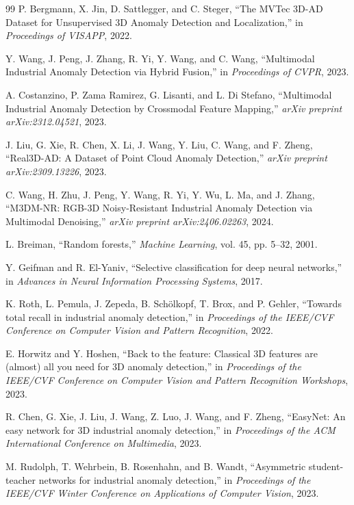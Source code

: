 \documentclass[11pt]{article}
\begin{document}
\begin{thebibliography}{99}
P. Bergmann, X. Jin, D. Sattlegger, and C. Steger, ``The MVTec 3D-AD Dataset
for Unsupervised 3D Anomaly Detection and Localization,'' in
\emph{Proceedings of VISAPP}, 2022.

Y. Wang, J. Peng, J. Zhang, R. Yi, Y. Wang, and C. Wang, ``Multimodal
Industrial Anomaly Detection via Hybrid Fusion,'' in \emph{Proceedings of
CVPR}, 2023.

A. Costanzino, P. Zama Ramirez, G. Lisanti, and L. Di Stefano, ``Multimodal
Industrial Anomaly Detection by Crossmodal Feature Mapping,'' \emph{arXiv
preprint arXiv:2312.04521}, 2023.

J. Liu, G. Xie, R. Chen, X. Li, J. Wang, Y. Liu, C. Wang, and F. Zheng,
``Real3D-AD: A Dataset of Point Cloud Anomaly Detection,'' \emph{arXiv
preprint arXiv:2309.13226}, 2023.

C. Wang, H. Zhu, J. Peng, Y. Wang, R. Yi, Y. Wu, L. Ma, and J. Zhang,
``M3DM-NR: RGB-3D Noisy-Resistant Industrial Anomaly Detection via Multimodal
Denoising,'' \emph{arXiv preprint arXiv:2406.02263}, 2024.

L. Breiman, ``Random forests,'' \emph{Machine Learning}, vol. 45, pp. 5--32,
2001.

Y. Geifman and R. El-Yaniv, ``Selective classification for deep neural
networks,'' in \emph{Advances in Neural Information Processing Systems},
2017.

K. Roth, L. Pemula, J. Zepeda, B. Sch\"olkopf, T. Brox, and P. Gehler,
``Towards total recall in industrial anomaly detection,'' in
\emph{Proceedings of the IEEE/CVF Conference on Computer Vision and
Pattern Recognition}, 2022.

E. Horwitz and Y. Hoshen, ``Back to the feature: Classical 3D features
are (almost) all you need for 3D anomaly detection,'' in
\emph{Proceedings of the IEEE/CVF Conference on Computer Vision and
Pattern Recognition Workshops}, 2023.

R. Chen, G. Xie, J. Liu, J. Wang, Z. Luo, J. Wang, and F. Zheng,
``EasyNet: An easy network for 3D industrial anomaly detection,'' in
\emph{Proceedings of the ACM International Conference on Multimedia},
2023.

M. Rudolph, T. Wehrbein, B. Rosenhahn, and B. Wandt, ``Asymmetric
student-teacher networks for industrial anomaly detection,'' in
\emph{Proceedings of the IEEE/CVF Winter Conference on Applications of
Computer Vision}, 2023.


\end{thebibliography}
\end{document}
